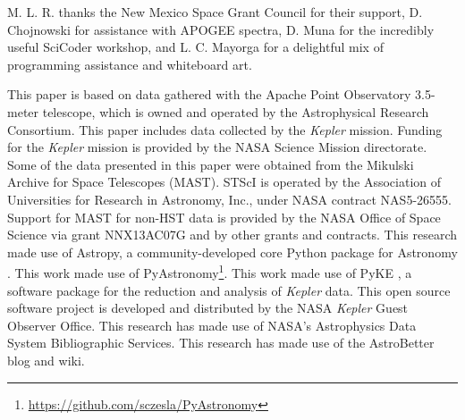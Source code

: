 \acknowledgments
M. L. R. thanks the New Mexico Space Grant Council for their support, D. Chojnowski for assistance with APOGEE spectra, D. Muna for the incredibly useful SciCoder workshop, and L. C. Mayorga for a delightful mix of programming assistance and whiteboard art.

This paper is based on data gathered with the Apache Point Observatory 3.5-meter telescope, which is owned and operated by the Astrophysical Research Consortium. This paper includes data collected by the \emph{Kepler} mission. Funding for the \emph{Kepler} mission is provided by the NASA Science Mission directorate. Some of the data presented in this paper were obtained from the Mikulski Archive for Space Telescopes (MAST). STScI is operated by the Association of Universities for Research in Astronomy, Inc., under NASA contract NAS5-26555. Support for MAST for non-HST data is provided by the NASA Office of Space Science via grant NNX13AC07G and by other grants and contracts. This research made use of Astropy, a community-developed core Python package for Astronomy \citep{astropy}. This work made use of PyAstronomy\footnote{\url{https://github.com/sczesla/PyAstronomy}}. This work made use of PyKE \citep{pyke}, a software package for the reduction and analysis of \emph{Kepler} data. This open source software project is developed and distributed by the NASA \emph{Kepler} Guest Observer Office. This research has made use of NASA's Astrophysics Data System Bibliographic Services. This research has made use of the AstroBetter blog and wiki.
  